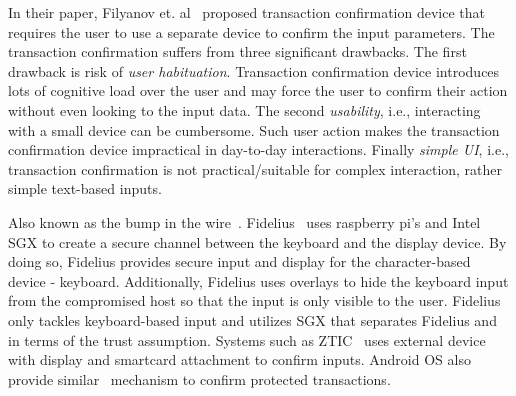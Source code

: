  In their paper, Filyanov et. al~\cite{filyanov2011uni} proposed transaction confirmation device that requires the user to use a separate device to confirm the input parameters. The transaction confirmation suffers from three significant drawbacks. The first drawback is risk of \emph{user habituation}. Transaction confirmation device introduces lots of cognitive load over the user and may force the user to confirm their action without even looking to the input data. The second \emph{usability}, i.e., interacting with a small device can be cumbersome. Such user action makes the transaction confirmation device impractical in day-to-day interactions. Finally \emph{simple UI}, i.e., transaction confirmation is not practical/suitable for complex interaction, rather simple text-based inputs. 


  Also known as the bump in the wire~\cite{McCPerRei2006}. Fidelius~\cite{Fidelius} uses raspberry pi's and Intel SGX to create a secure channel between the keyboard and the display device. By doing so, Fidelius provides secure input and display for the character-based device - keyboard. Additionally, Fidelius uses overlays to hide the keyboard input from the compromised host so that the input is only visible to the user. Fidelius only tackles keyboard-based input and utilizes SGX that separates Fidelius and \name in terms of the trust assumption. Systems such as ZTIC~\cite{weigold2011secure} uses external device with display and smartcard attachment to confirm inputs. Android OS also provide similar~\cite{android_confirm} mechanism to confirm protected transactions.


